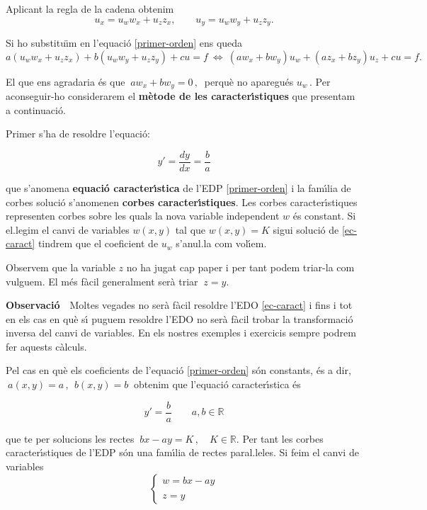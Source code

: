 \documentclass[12pt]{article}
\newcommand{\observacio}{\textbf{Observaci{\'o}}\ \ }
\newcommand{\R}{\mathbb{R}}
\begin{document}
Aplicant la regla de la cadena obtenim
\[
 u_x=u_w w_x+u_zz_x,\qquad u_y=u_ww_y+u_zz_y.
\]

Si ho substitu{\"\i}m en l'equaci{\'o} \eqref{primer-orden} ens queda
\[
 a(u_w w_x+u_zz_x)+b(u_ww_y+u_zz_y)+cu=f \ \iff \ (aw_x+bw_y)u_w+(az_x+bz_y)u_z+cu=f.
\]


El que ens agradaria {\'e}s que $\ aw_x+bw_y=0\,,\ $ perqu{\`e} no aparegu{\'e}s $u_w\,.$  Per aconseguir-ho considerarem el \textbf{m{\`e}tode de les caracter{\'\i}stiques} que presentam a continuaci{\'o}.

Primer s'ha de resoldre l'equaci{\'o}:

\begin{equation}\label{ec-caract}
y'= \frac{dy}{dx}=\frac{b}{a}
\end{equation}

que s'anomena \textbf{equaci{\'o} caracter{\'\i}stica} de l'EDP \eqref{primer-orden}
i la fam{\'\i}lia de corbes soluci{\'o} s'anomenen \textbf{corbes caracter{\'\i}stiques}. Les corbes caracter{\'\i}stiques
representen corbes sobre les quals la nova variable independent $w$ {\'e}s constant. Si el.legim el canvi de variables $w(x,y)$ tal que $w(x,y) = K$ sigui soluci{\'o} de \eqref{ec-caract} tindrem que el  coeficient de $u_w$  s'anul.la com vol{\'\i}em.

Observem que la variable $z$ no ha jugat cap paper i per tant podem triar-la com vulguem. El m{\'e}s f{\`a}cil generalment ser{\`a} triar $\ z=y.$


\vspace{0.3cm}
\observacio Moltes vegades no ser{\`a} f{\`a}cil resoldre l'EDO \eqref{ec-caract} i fins i tot en els cas en qu{\`e} s{\'\i}
puguem resoldre l'EDO no ser{\`a} f{\`a}cil trobar la transformaci{\'o} inversa del canvi de variables. En els nostres
exemples i exercicis sempre podrem fer aquests c{\`a}lculs.

\vspace{0.4cm}
Pel cas en qu{\`e} els coeficients de l'equaci{\'o} \eqref{primer-orden} s{\'o}n constants, {\'e}s a dir, $\ a(x,y)=a\,,\ \ b(x,y)=b\ $ obtenim que l'equaci{\'o} caracter{\'\i}stica {\'e}s

$$
y'=\frac{b}{a}\qquad a,b\in\R
$$

que te per solucions les rectes $\ bx-ay=K\,,\quad K\in\R.$ Per tant les corbes caracter{\'\i}stiques de l'EDP s{\'o}n una fam{\'\i}lia de rectes paral.leles. Si feim el canvi de variables
\[
 \left\{
 \begin{array}{l}
 w=bx-ay\\
 \\
 z=y
 \end{array}
 \right.
\]
\end{document}
